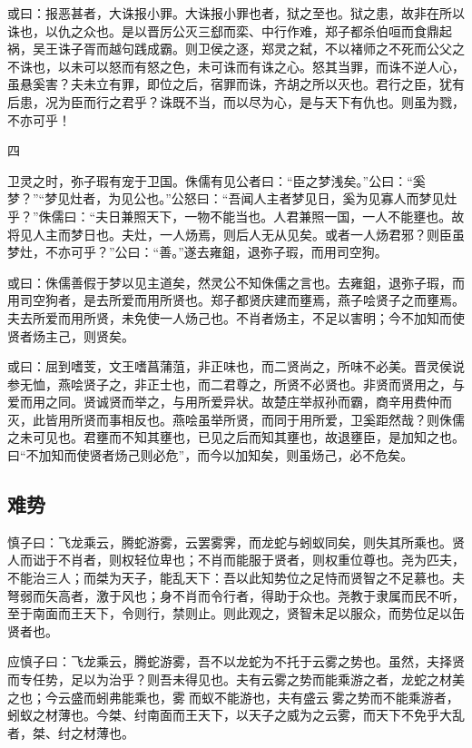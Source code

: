 \documentclass[]{article}
\begin{document}
或曰：报恶甚者，大诛报小罪。大诛报小罪也者，狱之至也。狱之患，故非在所以诛也，以仇之众也。是以晋厉公灭三郄而栾、中行作难，郑子都杀伯咺而食鼎起祸，吴王诛子胥而越句践成霸。则卫侯之逐，郑灵之弑，不以褚师之不死而公父之不诛也，以未可以怒而有怒之色，未可诛而有诛之心。怒其当罪，而诛不逆人心，虽悬奚害？夫未立有罪，即位之后，宿罪而诛，齐胡之所以灭也。君行之臣，犹有后患，况为臣而行之君乎？诛既不当，而以尽为心，是与天下有仇也。则虽为戮，不亦可乎！

四

卫灵之时，弥子瑕有宠于卫国。侏儒有见公者曰：``臣之梦浅矣。''公曰：``奚梦？''``梦见灶者，为见公也。''公怒曰：``吾闻人主者梦见日，奚为见寡人而梦见灶乎？''侏儒曰：``夫日兼照天下，一物不能当也。人君兼照一国，一人不能壅也。故将见人主而梦日也。夫灶，一人炀焉，则后人无从见矣。或者一人炀君邪？则臣虽梦灶，不亦可乎？''公曰：``善。''遂去雍鉏，退弥子瑕，而用司空狗。

或曰：侏儒善假于梦以见主道矣，然灵公不知侏儒之言也。去雍鉏，退弥子瑕，而用司空狗者，是去所爱而用所贤也。郑子都贤庆建而壅焉，燕子哙贤子之而壅焉。夫去所爱而用所贤，未免使一人炀己也。不肖者炀主，不足以害明；今不加知而使贤者炀主己，则贤矣。

或曰：屈到嗜芰，文王嗜菖蒲菹，非正味也，而二贤尚之，所味不必美。晋灵侯说参无恤，燕哙贤子之，非正士也，而二君尊之，所贤不必贤也。非贤而贤用之，与爱而用之同。贤诚贤而举之，与用所爱异状。故楚庄举叔孙而霸，商辛用费仲而灭，此皆用所贤而事相反也。燕哙虽举所贤，而同于用所爱，卫奚距然哉？则侏儒之未可见也。君壅而不知其壅也，已见之后而知其壅也，故退壅臣，是加知之也。曰``不加知而使贤者炀己则必危''，而今以加知矣，则虽炀己，必不危矣。

\hypertarget{header-n1583}{%
\subsection{难势}\label{header-n1583}}

慎子曰：飞龙乘云，腾蛇游雾，云罢雾霁，而龙蛇与蚓蚁同矣，则失其所乘也。贤人而诎于不肖者，则权轻位卑也；不肖而能服于贤者，则权重位尊也。尧为匹夫，不能治三人；而桀为天子，能乱天下：吾以此知势位之足恃而贤智之不足慕也。夫弩弱而矢高者，激于风也；身不肖而令行者，得助于众也。尧教于隶属而民不听，至于南面而王天下，令则行，禁则止。则此观之，贤智未足以服众，而势位足以缶贤者也。

应慎子曰：飞龙乘云，腾蛇游雾，吾不以龙蛇为不托于云雾之势也。虽然，夫择贤而专任势，足以为治乎？则吾未得见也。夫有云雾之势而能乘游之者，龙蛇之材美之也；今云盛而蚓弗能乘也，雾而蚁不能游也，夫有盛云雾之势而不能乘游者，蚓蚁之材薄也。今桀、纣南面而王天下，以天子之威为之云雾，而天下不免乎大乱者，桀、纣之材薄也。
\end{document}
